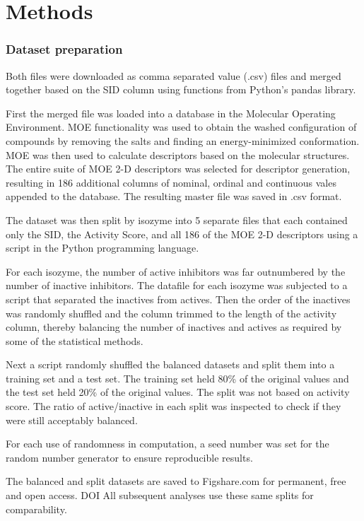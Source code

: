 \section{Methods}
\subsubsection{Dataset preparation}


Both files were downloaded as comma separated value (.csv) files and merged together based on the SID column using functions from Python's pandas library.

First the merged file was loaded into a database in the Molecular Operating Environment. MOE functionality was used to obtain the washed configuration of compounds by removing the salts and finding an energy-minimized conformation. MOE was then used to calculate descriptors based on the molecular structures. The entire suite of MOE 2-D descriptors was selected for descriptor generation, resulting in 186 additional columns of nominal, ordinal and continuous vales appended to the database. The resulting master file was saved in .csv format.

The dataset was then split by isozyme into 5 separate files that each contained only the SID, the Activity Score, and all 186 of the MOE 2-D descriptors using a script in the Python programming language.

For each isozyme, the number of active inhibitors was far outnumbered by the number of inactive inhibitors. The datafile for each isozyme was subjected to a script that separated the inactives from actives. Then the order of the inactives was randomly shuffled and the column trimmed to the length of the activity column, thereby balancing the number of inactives and actives as required by some of the statistical methods. 

Next a script randomly shuffled the balanced datasets and split them into a training set and a test set. The training set held 80\% of the original values and the test set held 20\% of the original values. The split was not based on activity score. The ratio of active/inactive in each split was inspected to check if they were still acceptably balanced.

For each use of randomness in computation, a seed number was set for the random number generator to ensure reproducible results.  

The balanced and split datasets are saved to Figshare.com for permanent, free and open access. DOI All subsequent analyses use these same splits for comparability.


